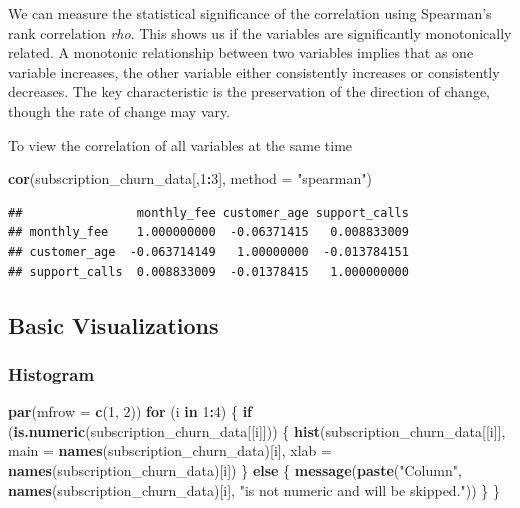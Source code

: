 \documentclass[
]{article}
\newenvironment{Shaded}{\begin{snugshade}}{\end{snugshade}}
\newcommand{\AttributeTok}[1]{\textcolor[rgb]{0.13,0.29,0.53}{#1}}
\newcommand{\ControlFlowTok}[1]{\textcolor[rgb]{0.13,0.29,0.53}{\textbf{#1}}}
\newcommand{\DecValTok}[1]{\textcolor[rgb]{0.00,0.00,0.81}{#1}}
\newcommand{\FunctionTok}[1]{\textcolor[rgb]{0.13,0.29,0.53}{\textbf{#1}}}
\newcommand{\NormalTok}[1]{#1}
\newcommand{\SpecialCharTok}[1]{\textcolor[rgb]{0.81,0.36,0.00}{\textbf{#1}}}
\newcommand{\StringTok}[1]{\textcolor[rgb]{0.31,0.60,0.02}{#1}}
\begin{document}
We can measure the statistical significance of the correlation using
Spearman's rank correlation \emph{rho}. This shows us if the variables
are significantly monotonically related. A monotonic relationship
between two variables implies that as one variable increases, the other
variable either consistently increases or consistently decreases. The
key characteristic is the preservation of the direction of change,
though the rate of change may vary.

To view the correlation of all variables at the same time

\begin{Shaded}
\begin{Highlighting}[]
\FunctionTok{cor}\NormalTok{(subscription\_churn\_data[,}\DecValTok{1}\SpecialCharTok{:}\DecValTok{3}\NormalTok{], }\AttributeTok{method =} \StringTok{"spearman"}\NormalTok{)}
\end{Highlighting}
\end{Shaded}

\begin{verbatim}
##                monthly_fee customer_age support_calls
## monthly_fee    1.000000000  -0.06371415   0.008833009
## customer_age  -0.063714149   1.00000000  -0.013784151
## support_calls  0.008833009  -0.01378415   1.000000000
\end{verbatim}

\subsection{Basic Visualizations}\label{basic-visualizations}

\subsubsection{Histogram}\label{histogram}

\begin{Shaded}
\begin{Highlighting}[]
\FunctionTok{par}\NormalTok{(}\AttributeTok{mfrow =} \FunctionTok{c}\NormalTok{(}\DecValTok{1}\NormalTok{, }\DecValTok{2}\NormalTok{))}
\ControlFlowTok{for}\NormalTok{ (i }\ControlFlowTok{in} \DecValTok{1}\SpecialCharTok{:}\DecValTok{4}\NormalTok{) \{}
  \ControlFlowTok{if}\NormalTok{ (}\FunctionTok{is.numeric}\NormalTok{(subscription\_churn\_data[[i]])) \{}
    \FunctionTok{hist}\NormalTok{(subscription\_churn\_data[[i]],}
         \AttributeTok{main =} \FunctionTok{names}\NormalTok{(subscription\_churn\_data)[i],}
         \AttributeTok{xlab =} \FunctionTok{names}\NormalTok{(subscription\_churn\_data)[i])}
\NormalTok{  \} }\ControlFlowTok{else}\NormalTok{ \{}
    \FunctionTok{message}\NormalTok{(}\FunctionTok{paste}\NormalTok{(}\StringTok{"Column"}\NormalTok{, }\FunctionTok{names}\NormalTok{(subscription\_churn\_data)[i],}
                  \StringTok{"is not numeric and will be skipped."}\NormalTok{))}
\NormalTok{  \}}
\NormalTok{\}}
\end{Highlighting}
\end{Shaded}
\end{document}

